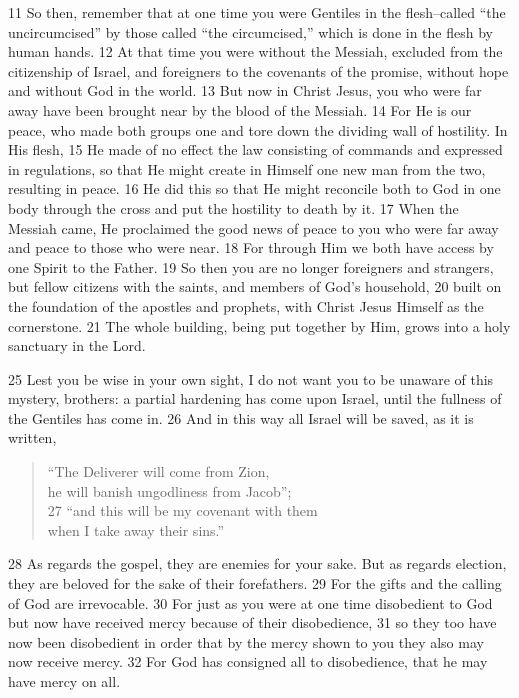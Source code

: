 \begin{bible}
11 So then, remember that at one time you were Gentiles in the flesh--called ``the uncircumcised'' by those called ``the circumcised,'' which is done in the flesh by human hands. 12 At that time you were without the Messiah, excluded from the citizenship of Israel, and foreigners to the covenants of the promise, without hope and without God in the world. 13 But now in Christ Jesus, you who were far away have been brought near by the blood of the Messiah. 14 For He is our peace, who made both groups one and tore down the dividing wall of hostility. In His flesh, 15 He made of no effect the law consisting of commands and expressed in regulations, so that He might create in Himself one new man from the two, resulting in peace. 16 He did this so that He might reconcile both to God in one body through the cross and put the hostility to death by it. 17 When the Messiah came, He proclaimed the good news of peace to you who were far away and peace to those who were near. 18 For through Him we both have access by one Spirit to the Father. 19 So then you are no longer foreigners and strangers, but fellow citizens with the saints, and members of God's household, 20 built on the foundation of the apostles and prophets, with Christ Jesus Himself as the cornerstone. 21 The whole building, being put together by Him, grows into a holy sanctuary in the Lord.


25 Lest you be wise in your own sight, I do not want you to be unaware of this mystery, brothers: a partial hardening has come upon Israel, until the fullness of the Gentiles has come in. 26 And in this way all Israel will be saved, as it is written,
\begin{quote}
``The Deliverer will come from Zion,\\
    he will banish ungodliness from Jacob'';\\
27 ``and this will be my covenant with them\\
    when I take away their sins.''
\end{quote}
28 As regards the gospel, they are enemies for your sake. But as regards election, they are beloved for the sake of their forefathers. 29 For the gifts and the calling of God are irrevocable. 30 For just as you were at one time disobedient to God but now have received mercy because of their disobedience, 31 so they too have now been disobedient in order that by the mercy shown to you they also may now receive mercy. 32 For God has consigned all to disobedience, that he may have mercy on all.


\end{bible}
